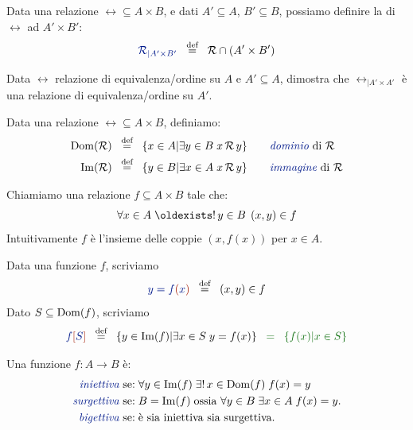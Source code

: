 \begin{definition}
	Data una relazione $\rel \subseteq A \times B$, e dati $A'
\subseteq A$, $B' \subseteq B$, possiamo definire la 
di $\rel$ ad $A'\times B'$:
	\[ {\drkblu \rel_{|A' \times B'}} \;\;\Mydef\;\; \rel \cap (A' \times B')
		\]
\end{definition}

\begin{exercise}
	Data $\rel$ relazione di equivalenza/ordine su $A$ e $A' \subseteq A$, dimostra che $\rel_{|A' \times A'}$ \`e una relazione di equivalenza/ordine su $A'$.
\end{exercise}

\begin{definition}
	Data una relazione $\rel \subseteq A \times B$, definiamo:
	\[  \begin{split}
		\Dom(\rel) &\;\;\Mydef\;\; \{x \in A | \exists {y \in B} \;
x\,\rel\, y\} \qquad \text{\vocab{dominio} di $\rel$} \\
	    \Imm(\rel) &\;\;\Mydef\;\; \{y \in B | \exists {x \in A} \; x\,
\rel\, y \} \qquad \text{\vocab{immagine} di $\rel$}
	\end{split}
			\]
\end{definition}

\begin{definition}
	Chiamiamo  una relazione $f \subseteq A \times B$ tale che:
	\[ \forall {x \in A} \; \existsun {y \in B} \; (x,y) \in f
		\]
	{\drkgrn Intuitivamente $f$ \`e l'insieme delle coppie $(x,f(x))$
per $x \in A$.}
\end{definition}

\begin{notation}
	Data una funzione $f$, scriviamo
	\[ {\drkblu y = f\drkred (\drkblu x\drkred )} \;\;\Mydef\;\; (x,y) \in f
		\]
	Dato $S \subseteq \operatorname{Dom}(f)$, scriviamo
	\[ {\drkblu f\drkred [\drkblu S\drkred ]} \;\;\Mydef\;\; \{y \in
\Imm(f)| \exists {x \in S }\; y = f(x) \} \drkgrn \;\;=\;\; \{f(x) | x \in S\}
		\]
\end{notation}

\begin{definition}
	Una funzione $f: A \rightarrow B$ \`e:
	\[ \begin{split}
		\text{\vocab{iniettiva} se:}\; & \forall y \in \Imm(f)\; \exists! \, x \in \Dom(f) \; f(x) = y\\
		\text{\vocab{surgettiva} se:}\; & B = \Imm(f)\; \text{ossia $\forall y \in B \; \exists x \in A \; f(x) = y$.}\\
		\text{\vocab{bigettiva} se:}\; &\text{\`e sia iniettiva sia surgettiva.}
	\end{split}
		\]
\end{definition}

